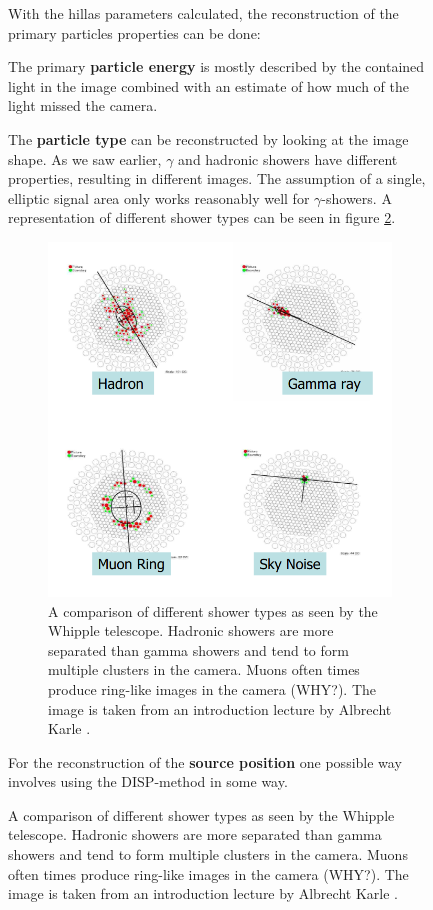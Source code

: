 \begin{figure}
With the hillas parameters calculated, the reconstruction of the 
primary particles properties can be done:

The primary \textbf{particle energy} is mostly described by the contained light in the image combined with 
an estimate of how much of the light missed the camera. 

The \textbf{particle type} can be reconstructed 
by looking at the image shape.
As we saw earlier, $\gamma$ and hadronic showers have different properties, 
resulting in different images. The assumption of a single, elliptic signal
area only works reasonably well for $\gamma$-showers.
A representation of different shower types can be seen in figure \ref{fig:compare_showers}.

\begin{figure}
	\centering
	\captionsetup{width=0.9\linewidth}
	\includegraphics[width=.9\textwidth]{images/shower_types.png}
	\caption{A comparison of different shower types as seen 
	by the Whipple telescope.
	Hadronic showers are more separated than gamma showers and tend to
	form multiple clusters in the camera.
	Muons often times produce ring-like images in the camera (WHY?).
	The image is taken from an introduction lecture by Albrecht Karle \cite{icecube_showers}.}
	\label{fig:compare_showers}
\end{figure}

For the reconstruction of the \textbf{source position}
one possible way involves using the DISP-method in some way.


\end{figure}
